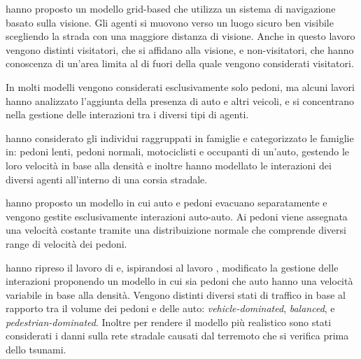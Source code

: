 \textcite{wijerathne2013hpc} hanno proposto un modello grid-based che utilizza un sistema di navigazione basato
sulla visione. Gli agenti si muovono verso un luogo sicuro ben visibile scegliendo la strada con una maggiore distanza di visione.
%
Anche in questo lavoro vengono distinti visitatori, che si affidano alla visione, e non-visitatori, che hanno conoscenza di un'area
limita al di fuori della quale vengono considerati visitatori.




In molti modelli vengono considerati esclusivamente solo pedoni, ma alcuni lavori hanno analizzato l'aggiunta della presenza di auto e altri veicoli,
e si concentrano nella gestione delle interazioni tra i diversi tipi di agenti.

\textcite{goto2012tsunami} hanno considerato gli individui raggruppati in famiglie e categorizzato le famiglie in:
pedoni lenti, pedoni normali, motociclisti e occupanti di un'auto, gestendo le loro velocità in base alla densità e inoltre hanno
modellato le interazioni dei diversi agenti all'interno di una corsia stradale.

\textcite{wang2016agent} hanno proposto un modello in cui auto e pedoni evacuano separatamente e vengono gestite esclusivamente interazioni auto-auto. Ai pedoni viene assegnata
una velocità costante tramite una distribuizione normale che comprende diversi range di velocità dei pedoni.

\textcite{wang2021novel} hanno ripreso il lavoro di \textcite{wang2016agent} e, 
ispirandosi al lavoro \textcite{goto2012tsunami}, modificato la gestione delle interazioni proponendo un modello in cui sia pedoni che auto hanno una velocità variabile in base alla densità.
Vengono distinti diversi stati di traffico in base al rapporto tra il volume dei pedoni e delle auto: \textit{vehicle-dominated}, \textit{balanced}, e \textit{pedestrian-dominated}. 
Inoltre per rendere il modello più realistico sono stati considerati i danni sulla rete stradale causati dal terremoto che si verifica prima dello tsunami.

